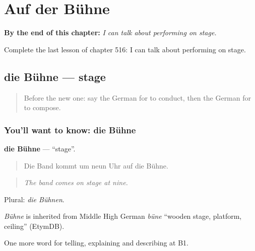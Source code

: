 
\chapter{Auf der Bühne}
\label{ch:ge-auf-der-buhne}

\begin{chapteropening}
\textbf{By the end of this chapter:} \emph{I can talk about performing on stage.}

Complete the last lesson of chapter 516: I can talk about performing on stage.
\end{chapteropening}

\section[die Bühne]{die Bühne — stage}

\label{lesson:GE-C516-buehne}



\begin{quote}
Before the new one: say the German for to conduct, then the German for to compose.
\end{quote}

\subsection*{You'll want to know: die Bühne}
\textbf{die Bühne} — \textquotedblleft{}stage\textquotedblright{}.

\begin{quote}
Die Band kommt um neun Uhr auf die Bühne.
\end{quote}

\begin{quote}
\emph{The band comes on stage at nine.}
\end{quote}

Plural: \emph{die Bühnen}.

\begin{cousinweb}
\emph{Bühne} is inherited from Middle High German \emph{büne} \textquotedblleft{}wooden stage, platform, ceiling\textquotedblright{} (EtymDB).
\end{cousinweb}

\begin{grammarlens}[title={What you've built}]
One more word for telling, explaining and describing at B1.
\end{grammarlens}

